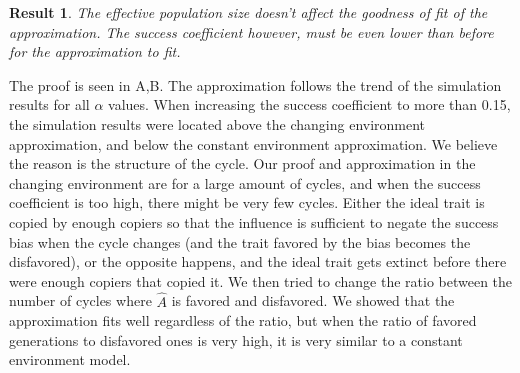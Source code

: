 \documentclass[12pt]{extarticle}
\newtheorem{result}{Result}
\begin{document}
\begin{result}
The effective population size doesn't affect the goodness of fit of the approximation. The success coefficient however, must be even lower than before for the approximation to fit.
\end{result}
The proof is seen in A,B. The approximation follows the trend of the simulation results for all $\alpha$ values.
When increasing the success coefficient to more than 0.15, the simulation results were located above the changing environment approximation, and below the constant environment approximation. We believe the reason is the structure of the cycle.
Our proof and approximation in the changing environment are for a large amount of cycles, and when the success coefficient is too high, there might be very few cycles. Either the ideal trait is copied by enough copiers so that the influence is sufficient to negate the success bias when the cycle changes (and the trait favored by the bias becomes the disfavored), or the opposite happens, and the ideal trait gets extinct before there were enough copiers that copied it.
We then tried to change the ratio between the number of cycles where $\hat{A}$ is favored and disfavored. We showed that the approximation fits well regardless of the ratio, but when the ratio of favored generations to disfavored ones is very high, it is very similar to a constant environment model.
\end{document}
